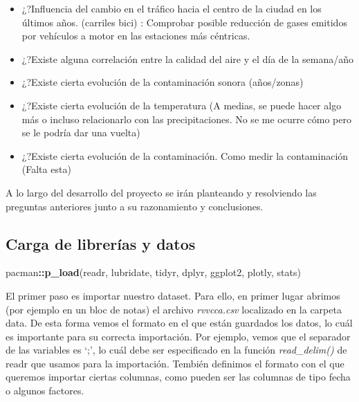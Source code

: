 \documentclass[notspecified,article,submit,moreauthors,pdftex]{Definitions/mdpi}
\newenvironment{Shaded}{\begin{snugshade}}{\end{snugshade}}
\newcommand{\FunctionTok}[1]{\textcolor[rgb]{0.13,0.29,0.53}{\textbf{#1}}}
\newcommand{\NormalTok}[1]{#1}
\newcommand{\SpecialCharTok}[1]{\textcolor[rgb]{0.81,0.36,0.00}{\textbf{#1}}}
\begin{document}
\begin{itemize}
\item
  ¿?Influencia del cambio en el tráfico hacia el centro de la ciudad en
  los últimos años. (carriles bici) : Comprobar posible reducción de
  gases emitidos por vehículos a motor en las estaciones más céntricas.
\item
  ¿?Existe alguna correlación entre la calidad del aire y el día de la
  semana/año
\item
  ¿?Existe cierta evolución de la contaminación sonora (años/zonas)
\item
  ¿?Existe cierta evolución de la temperatura (A medias, se puede hacer
  algo más o incluso relacionarlo con las precipitaciones. No se me
  ocurre cómo pero se le podría dar una vuelta)
\item
  ¿?Existe cierta evolución de la contaminación. Como medir la
  contaminación (Falta esta)
\end{itemize}

A lo largo del desarrollo del proyecto se irán planteando y resolviendo
las preguntas anteriores junto a su razonamiento y conclusiones.

\hypertarget{carga-de-libreruxedas-y-datos}{%
\subsection{Carga de librerías y
datos}\label{carga-de-libreruxedas-y-datos}}

\begin{Shaded}
\begin{Highlighting}[]
\NormalTok{pacman}\SpecialCharTok{::}\FunctionTok{p\_load}\NormalTok{(readr, lubridate, tidyr, dplyr, ggplot2, plotly, stats)}
\end{Highlighting}
\end{Shaded}

El primer paso es importar nuestro dataset. Para ello, en primer lugar
abrimos (por ejemplo en un bloc de notas) el archivo \emph{rvvcca.csv}
localizado en la carpeta data. De esta forma vemos el formato en el que
están guardados los datos, lo cuál es importante para su correcta
importación. Por ejemplo, vemos que el separador de las variables es
`;', lo cuál debe ser especificado en la función \emph{read\_delim()} de
readr que usamos para la importación. Tembién definimos el formato con
el que queremos importar ciertas columnas, como pueden ser las columnas
de tipo fecha o algunos factores.
\end{document}
